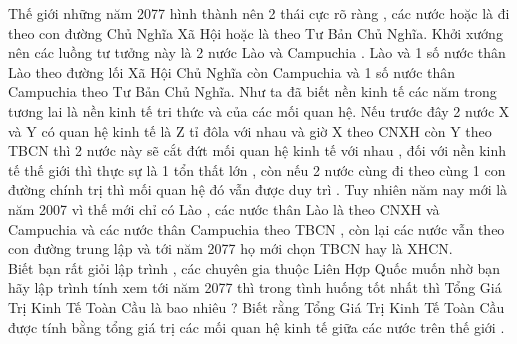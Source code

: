 Thế giới những năm 2077 hình thành nên 2 thái cực rõ ràng , các nước hoặc là đi theo con đường Chủ Nghĩa Xã Hội hoặc là theo Tư Bản Chủ Nghĩa. Khởi xướng nên các luồng tư tưởng này là 2 nước Lào và Campuchia . Lào và 1 số nước thân Lào theo đường lối Xã Hội Chủ Nghĩa còn Campuchia và 1 số nước thân Campuchia theo Tư Bản Chủ Nghĩa. Như ta đã biết nền kinh tế các năm trong tương lai là nền kinh tế tri thức và của các mối quan hệ. Nếu trước đây 2 nước X và Y có quan hệ kinh tế là Z tỉ đôla với nhau và giờ X theo CNXH còn Y theo TBCN thì 2 nước này sẽ cắt đứt mối quan hệ kinh tế với nhau , đối với nền kinh tế thế giới thì thực sự là 1 tổn thất lớn , còn nếu 2 nước cùng đi theo cùng 1 con đường chính trị thì mối quan hệ đó vẫn được duy trì . Tuy nhiên năm nay mới là năm 2007 vì thế mới chỉ có Lào , các nước thân Lào là theo CNXH và Campuchia và các nước thân Campuchia theo TBCN , còn lại các nước vẫn theo con đường trung lập và tới năm 2077 họ mới chọn TBCN hay là XHCN.   
\\   Biết bạn rất giỏi lập trình , các chuyên gia thuộc Liên Hợp Quốc muốn nhờ bạn hãy lập trình tính xem tới năm 2077 thì trong tình huống tốt nhất thì Tổng Giá Trị Kinh Tế Toàn Cầu là bao nhiêu ? Biết rằng Tổng Giá Trị Kinh Tế Toàn Cầu được tính bằng tổng giá trị các mối quan hệ kinh tế giữa các nước trên thế giới .  

\